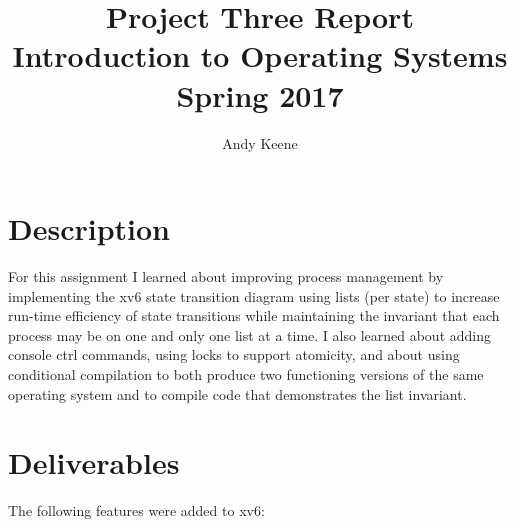 \documentclass[11pt,letterpaper]{report}
\author{Andy Keene}
\title{Project Three Report\\Introduction to Operating Systems\\ Spring 2017}
\date{}
\begin{document}
\newcommand{\ctrl}[1]{ctrl\,--\,#1}

	\maketitle
	

	\section*{Description}
	For this assignment I learned about improving process management by implementing the xv6 state transition diagram using lists (per state) to increase run-time efficiency of state transitions 
	while maintaining the invariant that each process may be on one and only one list at a time. 
	I also learned about
	adding console ctrl commands, using locks to support atomicity, and about using conditional compilation to both produce two functioning versions of the same operating system and to compile code that demonstrates the list invariant.
		
	\section*{Deliverables}
	The following features were added to xv6:
	
\end{document}
